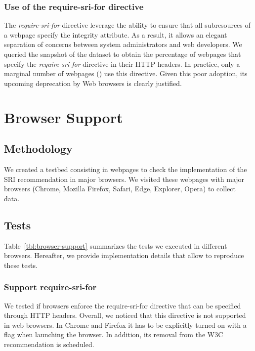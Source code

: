\documentclass[sigconf,table]{acmart}
\begin{document}


\subsubsection{Use of the require-sri-for directive}

The \textit{require-sri-for} directive leverage the ability to ensure that all subresources of a webpage specify the integrity attribute.
As a result, it allows an elegant separation of concerns between system administrators and web developers.
We queried the \CCSnapshotLatest snapshot of the \CCSRI dataset to obtain the percentage of webpages that specify the \textit{require-sri-for} directive in their HTTP headers.
In practice, only a marginal number of webpages (\CCRequireSriForP) use this directive.
Given this poor adoption, its upcoming deprecation by Web browsers is clearly justified.



\section{Browser Support} \label{sec:browser-support}

\subsection{Methodology}

We created a testbed consisting in webpages to check the implementation of the SRI recommendation in major browsers.
We visited these webpages with major browsers (Chrome, Mozilla Firefox, Safari, Edge, Explorer, Opera) to collect data.

\subsection{Tests}

Table~\ref{tbl:browser-support} summarizes the tests we executed in different browsers.
Hereafter, we provide implementation details that allow to reproduce these tests.

\subsubsection{Support require-sri-for}
We tested if browsers enforce the require-sri-for directive that can be specified through HTTP headers.
Overall, we noticed that this directive is not supported in web browsers.
In Chrome and Firefox it has to be explicitly turned on with a flag when launching the browser.
In addition, its removal from the W3C recommendation is scheduled.
\end{document}
